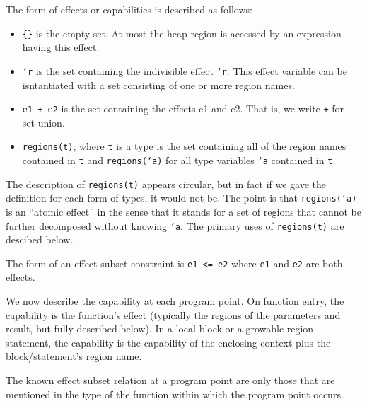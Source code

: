 The form of effects or capabilities is described as follows:
\begin{itemize}
\item \texttt{\{\}} is the empty set.  At most the heap region
  is accessed by an expression having this effect.
\item \texttt{`r} is the set containing the indivisible effect
  \texttt{`r}. This effect variable can be isntantiated with a set
  consisting of one or more region names. 
\item \texttt{e1 + e2} is the set containing the effects e1 and e2.
  That is, we write \texttt{+} for set-union.
\item \texttt{regions(t)}, where \texttt{t} is a type is the set
  containing all of the region names contained in \texttt{t} and
  \texttt{regions(`a)} for all type variables \texttt{`a} contained in
  \texttt{t}.
\end{itemize}
The description of \texttt{regions(t)} appears circular, but in fact
if we gave the definition for each form of types, it would not be.
The point is that \texttt{regions(`a)} is an ``atomic effect'' in the
sense that it stands for a set of regions that cannot be further
decomposed without knowing \texttt{`a}.  The primary uses of
\texttt{regions(t)} are descibed below.

The form of an effect subset constraint is \texttt{e1 <= e2} where
\texttt{e1} and \texttt{e2} are both effects.

We now describe the capability at each program point.  On function
entry, the capability is the function's effect (typically the regions
of the parameters and result, but fully described below).  In
a local block or a growable-region statement, the capability is the
capability of the enclosing context plus the block/statement's region
name. 

The known effect subset relation at a program point are only those
that are mentioned in the type of the function within which the
program point occurs.


